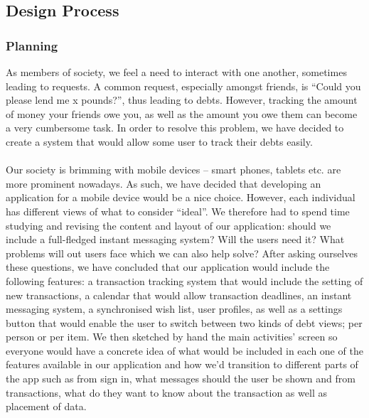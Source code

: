 \documentclass[a4paper,11pt]{article}
\begin{document}
\subsection*{Design Process}
\subsubsection*{Planning}
As members of society, we feel a need to interact with one another, sometimes leading to requests. A common request, especially amongst friends, is “Could you please lend me x pounds?”, thus leading to debts. However, tracking the amount of money your friends owe you, as well as the amount you owe them can become a very cumbersome task. In order to resolve this problem, we have decided to create a system that would allow some user to track their debts easily. \\ \\
Our society is brimming with mobile devices – smart phones, tablets etc. are more prominent nowadays. As such, we have decided that developing an application for a mobile device would be a nice choice. However, each individual has different views of what to consider “ideal”. We therefore had to spend time studying and revising the content and layout of our application: should we include a full-fledged instant messaging system? Will the users need it? What problems will out users face which we can also help solve? After asking ourselves these questions, we have concluded that our application would include the following features: a transaction tracking system that would include the setting of new transactions, a calendar that would allow transaction deadlines, an instant messaging system, a synchronised wish list, user profiles, as well as a settings button that would enable the user to switch between two kinds of debt views; per person or per item. We then sketched by hand the main activities’ screen so everyone would have a concrete idea of what would be included in each one of the features available in our application and how we'd transition to different parts of the app such as from sign in, what messages should the user be shown and from transactions, what do they want to know about the transaction as well as placement of data.
\end{document}

